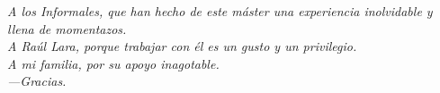 \documentclass[11pt,openany]{book}
\begin{document}


\thispagestyle{empty}
\vfill
\begin{flushright}
  \begin{minipage}{0.6\textwidth} %
    \raggedleft
    \vspace{5cm}
    \textit{
      A los \guillemotleft Informales\guillemotright, que han hecho de este máster una experiencia inolvidable y llena de momentazos.\\
      A Raúl Lara, porque trabajar con él es un gusto y un privilegio.\\
      A mi familia, por su apoyo inagotable.\\
    }
    \vspace{1cm}
    \textit{---Gracias.}
  \end{minipage}

\end{flushright}
\vfill

\tableofcontents





















\printbibliography
\end{document}
